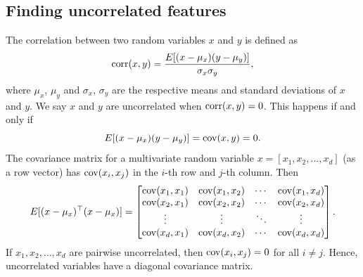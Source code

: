 \subsection{Finding uncorrelated features}

The correlation between two random variables \(x\) and \(y\) is defined as
\begin{equation}
    \operatorname{corr}(x,y) = \frac{E[(x-\mu_x)(y-\mu_y)]}{\sigma_x \sigma_y},
\end{equation}
where \(\mu_x\), \(\mu_y\) and \(\sigma_x\), \(\sigma_y\) are the respective means and standard deviations of \(x\) and \(y\).
We say \(x\) and \(y\) are uncorrelated when \(\operatorname{corr}(x,y) = 0\).
This happens if and only if
\begin{equation}
    \label{eqn:covariance-formula}
    E[(x-\mu_x)(y-\mu_y)] = \operatorname{cov}(x,y) = 0.
\end{equation}
The covariance matrix for a multivariate random variable \(x = [x_1, x_2, \dots, x_d]\) (as a row vector) has \(\operatorname{cov}(x_i, x_j)\) in the \(i\)-th row and \(j\)-th column.
Then
\begin{equation}
    \label{eqn:covariance-matrix-formula}
    E[(x-\mu_x)^\top (x-\mu_x)] =
    \begin{bmatrix}
        \operatorname{cov}(x_1, x_1) & \operatorname{cov}(x_1, x_2) & \cdots & \operatorname{cov}(x_1, x_d) \\
        \operatorname{cov}(x_2, x_1) & \operatorname{cov}(x_2, x_2) & \cdots & \operatorname{cov}(x_2, x_d) \\
        \vdots         & \vdots         & \ddots & \vdots         \\
        \operatorname{cov}(x_d, x_1) & \operatorname{cov}(x_d, x_2) & \cdots & \operatorname{cov}(x_d, x_d) \\
    \end{bmatrix}.
\end{equation}
If \(x_1, x_2, \dots, x_d\) are pairwise uncorrelated, then \(\operatorname{cov}(x_i, x_j) = 0\) for all \(i \neq j\).
Hence, uncorrelated variables have a diagonal covariance matrix.

